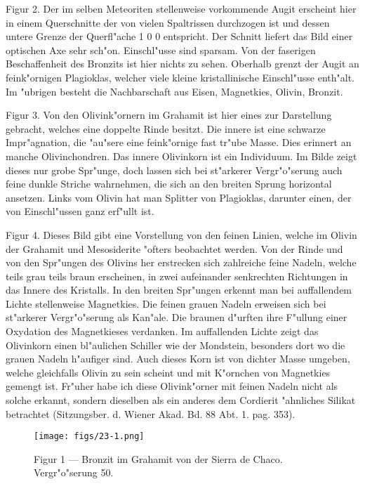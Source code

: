 \documentclass[a4paper, 11pt, oneside, polutonikogreek, german]{article}
\begin{document}
Figur 2. Der im selben Meteoriten stellenweise vorkommende Augit erscheint hier in einem Querschnitte der von vielen Spaltrissen durchzogen ist und dessen untere Grenze der Querfl"ache 1 0 0 entspricht. Der Schnitt liefert das Bild einer optischen Axe sehr sch"on. Einschl"usse sind sparsam. Von der faserigen Beschaffenheit des Bronzits ist hier nichts zu sehen. Oberhalb grenzt der Augit an feink"ornigen Plagioklas, welcher viele kleine kristallinische Einschl"usse enth"alt. Im "ubrigen besteht die Nachbarschaft aus Eisen, Magnetkies, Olivin, Bronzit.

Figur 3. Von den Olivink"ornern im Grahamit ist hier eines zur Darstellung gebracht, welches eine doppelte Rinde besitzt. Die innere ist eine schwarze Impr"agnation, die "au"sere eine feink"ornige fast tr"ube Masse. Dies erinnert an manche Olivinchondren. Das innere Olivinkorn ist ein Individuum. Im Bilde zeigt dieses nur grobe Spr"unge, doch lassen sich bei st"arkerer Vergr"o"serung auch feine dunkle Striche wahrnehmen, die sich an den breiten Sprung horizontal ansetzen. Links vom Olivin hat man Splitter von Plagioklas, darunter einen, der von Einschl"ussen ganz erf"ullt ist.

Figur 4. Dieses Bild gibt eine Vorstellung von den feinen Linien, welche im Olivin der Grahamit und Mesosiderite "ofters beobachtet werden. Von der Rinde und von den Spr"ungen des Olivins her erstrecken sich zahlreiche feine Nadeln, welche teils grau teils braun erscheinen, in zwei aufeinander senkrechten Richtungen in das Innere des Kristalls. In den breiten Spr"ungen erkennt man bei auffallendem Lichte stellenweise Magnetkies. Die feinen grauen Nadeln erweisen sich bei st"arkerer Vergr"o"serung als Kan"ale. Die braunen d"urften ihre F"ullung einer Oxydation des Magnetkieses verdanken. Im auffallenden Lichte zeigt das Olivinkorn einen bl"aulichen Schiller wie der Mondstein, besonders dort wo die grauen Nadeln h"aufiger sind. Auch dieses Korn ist von dichter Masse umgeben, welche gleichfalls Olivin zu sein scheint und mit K"ornchen von Magnetkies gemengt ist. Fr"uher habe ich diese Olivink"orner mit feinen Nadeln nicht als solche erkannt, sondern dieselben als ein anderes dem Cordierit "ahnliches Silikat betrachtet (Sitzungsber. d. Wiener Akad. Bd. 88 Abt. 1. pag. 353).
\clearpage

\vspace*{\fill}
\begin{figure}[H]
\centering
\texttt{[image: figs/23-1.png]}
\caption{\small Figur 1 --- Bronzit im Grahamit von der Sierra de Chaco. Vergr"o"serung 50.}
\end{figure}
\vspace*{\fill}
\clearpage
\end{document}
